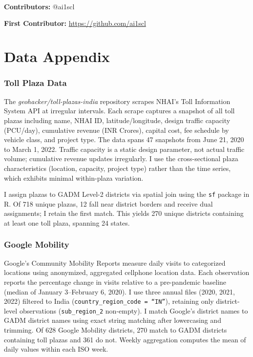 \documentclass[12pt]{article}
\begin{document}
\noindent\textbf{Contributors:} @ai1scl

\noindent\textbf{First Contributor:} \url{https://github.com/ai1scl}

\label{apep_main_text_end}
\newpage


\newpage
\appendix

\section{Data Appendix}

\subsubsection*{Toll Plaza Data} The \textit{geohacker/toll-plazas-india} repository scrapes NHAI's Toll Information System API at irregular intervals. Each scrape captures a snapshot of all toll plazas including name, NHAI ID, latitude/longitude, design traffic capacity (PCU/day), cumulative revenue (INR Crores), capital cost, fee schedule by vehicle class, and project type. The data spans 47 snapshots from June 21, 2020 to March 1, 2022. Traffic capacity is a static design parameter, not actual traffic volume; cumulative revenue updates irregularly. I use the cross-sectional plaza characteristics (location, capacity, project type) rather than the time series, which exhibits minimal within-plaza variation.

I assign plazas to GADM Level-2 districts via spatial join using the \texttt{sf} package in R. Of 718 unique plazas, 12 fall near district borders and receive dual assignments; I retain the first match. This yields 270 unique districts containing at least one toll plaza, spanning 24 states.

\subsubsection*{Google Mobility} Google's Community Mobility Reports measure daily visits to categorized locations using anonymized, aggregated cellphone location data. Each observation reports the percentage change in visits relative to a pre-pandemic baseline (median of January 3--February 6, 2020). I use three annual files (2020, 2021, 2022) filtered to India (\texttt{country\_region\_code = ``IN''}), retaining only district-level observations (\texttt{sub\_region\_2} non-empty). I match Google's district names to GADM district names using exact string matching after lowercasing and trimming. Of 628 Google Mobility districts, 270 match to GADM districts containing toll plazas and 361 do not. Weekly aggregation computes the mean of daily values within each ISO week.
\end{document}
